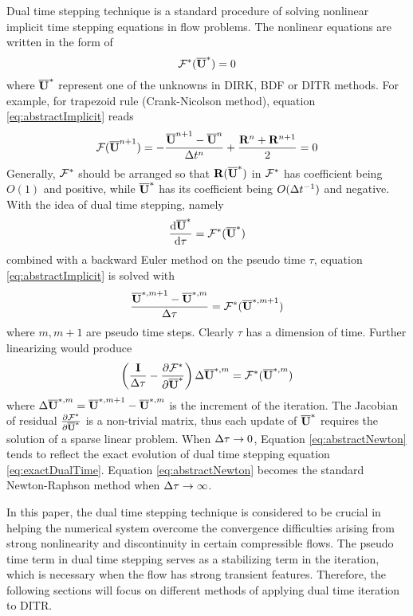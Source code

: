 \documentclass[preprint,12pt]{elsarticle}
\begin{document}
Dual time stepping technique \cite{jameson1991time,jameson2017evaluation}
is a standard procedure of solving nonlinear
implicit time stepping equations
in flow problems.
The nonlinear equations are written in the form of
\begin{equation}
    \mathcal{F}^*(\overline{\mathbf{U}}^*) = 0
    \label{eq:abstractImplicit}
\end{equation}
where $\overline{\mathbf{U}}^*$ represent one of the unknowns
in DIRK, BDF or DITR methods.
For example, for trapezoid rule (Crank-Nicolson method),
equation \eqref{eq:abstractImplicit} reads
\begin{equation}
    \label{eq:trapF}
    \mathcal{F}(\overline{\mathbf{U}}^{n+1}) =
    -\frac{\overline{\mathbf{U}}^{n+1}-\overline{\mathbf{U}}^{n}}{\mathrm\Delta t^n} + \frac{\mathbf{R}^{n} + \mathbf{R}^{n+1}}{2}
    =0
\end{equation}
Generally, $\mathcal{F}^*$ should be arranged so that
$\mathbf{R}(\overline{\mathbf{U}}^*)$ in $\mathcal{F}^*$ has coefficient being $O(1)$ and positive,
while $\overline{\mathbf{U}}^*$ has its coefficient being $O(\mathrm\Delta t^{-1})$ and negative.
With the idea of dual time stepping, namely
\begin{equation}
    \frac{\dd\overline{\mathbf{U}}^{*}}{\dd \tau} = \mathcal{F}^*(\overline{\mathbf{U}}^{*})
    \label{eq:exactDualTime}
\end{equation}
combined with a backward Euler method on the
pseudo time $\tau$, equation \eqref{eq:abstractImplicit}
is solved with
\begin{equation}
    \frac{\overline{\mathbf{U}}^{*,m+1} - \overline{\mathbf{U}}^{*,m}}{\mathrm\Delta \tau} = \mathcal{F}^*(\overline{\mathbf{U}}^{*,m+1})
\end{equation}
where $m, m+1$ are pseudo time steps.
Clearly $\tau$ has a dimension of time.
Further linearizing would produce
\begin{equation}
    \left(\frac{\eye}{\inc\tau} -
    \partialderivative{\FF^*}{\uu^*}  \right)
    \inc\uu^{*,m} = \FF^*(\uu^{*,m})
    \label{eq:abstractNewton}
\end{equation}
where $\mathrm\Delta\overline{\mathbf{U}}^{*,m} = \overline{\mathbf{U}}^{*,m+1} - \overline{\mathbf{U}}^{*,m}$ is the increment
of the iteration.
The Jacobian of residual $\partialderivative{\FF^*}{\uu^*}$
is a non-trivial matrix, thus each update of $\overline{\mathbf{U}}^*$ requires
the solution of a sparse linear problem.
When $\mathrm\Delta\tau\rightarrow0$, Equation \eqref{eq:abstractNewton}
tends to reflect the exact evolution of dual time stepping
equation \eqref{eq:exactDualTime}.
Equation \eqref{eq:abstractNewton} becomes the
standard Newton-Raphson method when $\mathrm\Delta\tau\rightarrow\infty$.

In this paper, the dual time stepping technique is considered to be crucial
in helping the numerical system overcome the convergence difficulties 
arising from strong nonlinearity and discontinuity 
in certain compressible flows. 
The pseudo time term in dual time stepping 
serves as a stabilizing term in the iteration, 
which is necessary when the flow has strong transient features.
Therefore, the following sections will focus on different
methods of applying dual time iteration to DITR.
\end{document}

